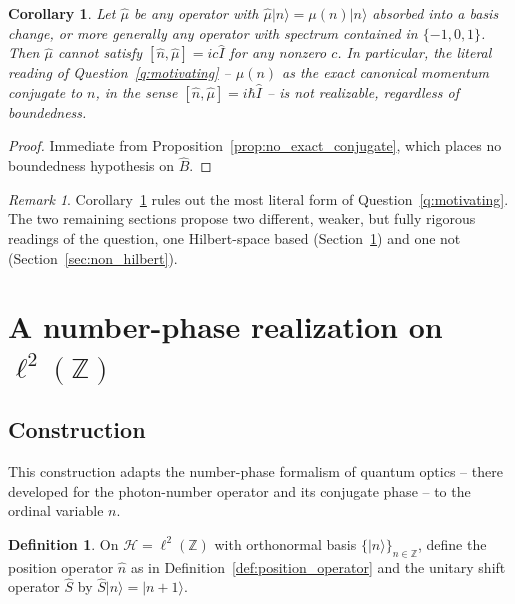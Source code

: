 \documentclass[11pt]{amsart}
\numberwithin{equation}{section}
\theoremstyle{plain}
\newtheorem{corollary}[theorem]{Corollary}
\theoremstyle{definition}
\newtheorem{definition}[theorem]{Definition}
\theoremstyle{remark}
\newtheorem{remark}[theorem]{Remark}
\newcommand{\Z}{\mathbb{Z}}
\newcommand{\Hil}{\mathcal{H}}
\begin{document}
\begin{corollary}
\label{cor:mu_not_conjugate}
Let $\hat\mu$ be any operator with $\hat\mu|n\rangle=\mu(n)|n\rangle$
absorbed into a basis change, or more generally any operator with
spectrum contained in $\{-1,0,1\}$. Then $\hat\mu$ cannot satisfy
$[\hat n,\hat\mu]=ic\hat I$ for any nonzero $c$. In particular, the
literal reading of Question~\ref{q:motivating} -- $\mu(n)$ as the exact
canonical momentum conjugate to $n$, in the sense $[\hat n,\hat\mu]=i\hbar\hat I$
-- is not realizable, regardless of boundedness.
\end{corollary}

\begin{proof}
Immediate from Proposition~\ref{prop:no_exact_conjugate}, which places
no boundedness hypothesis on $\hat B$.
\end{proof}

\begin{remark}
\label{rem:obstruction_consequence}
Corollary~\ref{cor:mu_not_conjugate} rules out the most literal form of
Question~\ref{q:motivating}. The two remaining sections propose two
different, weaker, but fully rigorous readings of the question, one
Hilbert-space based (Section~\ref{sec:number_phase}) and one not
(Section~\ref{sec:non_hilbert}).
\end{remark}

\section{A number-phase realization on $\ell^2(\Z)$}
\label{sec:number_phase}

\subsection{Construction}
\label{subsec:number_phase_construction}

This construction adapts the number-phase formalism of quantum optics
\cite{SusskindGlogower1964,CarruthersNieto1968} -- there developed for
the photon-number operator and its conjugate phase -- to the ordinal
variable $n$.

\begin{definition}
\label{def:shift_operator}
On $\Hil=\ell^2(\Z)$ with orthonormal basis $\{|n\rangle\}_{n\in\Z}$,
define the position operator $\hat n$ as in
Definition~\ref{def:position_operator} and the unitary shift operator
$\hat S$ by $\hat S|n\rangle=|n+1\rangle$.
\end{definition}
\end{document}
